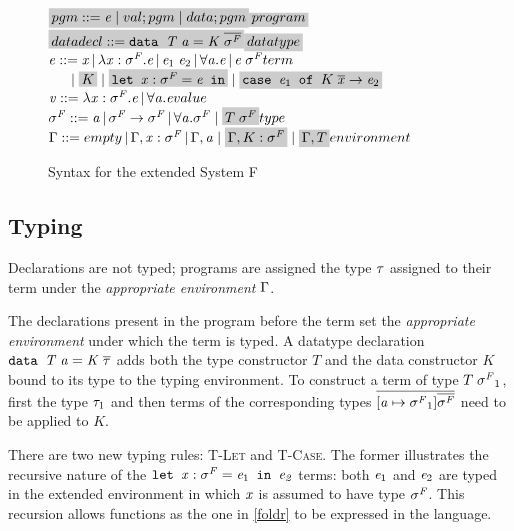 \begin{figure}
  $\highlight{pgm::= \term\; |\; val;pgm\; |\;data;pgm}\hfill \highlight{program}$\\
  $\highlight{datadecl::=\mathit{\texttt{data } T\; \tyVar = K \;\overline{\typeF}} }\hfill \highlight{datatype}$\\
  $\term ::= \tmVar\,|\,\lambda \tmVar:\typeF.\term\,|\,\term_1 \; \term_2 \,|\,\tyAbs{\tyVar}{\term}\,|\,\term\;\typeF \hfill term $\\
 $\phantom{aaa}|\;\highlight{K} \;|\;\highlight{\mathit{\texttt{let }} \tmVar : \typeF = \term \mathit{\texttt{ in}}} \;|\;\highlight{ \mathit{\texttt{case }} \term_1 \mathit{\texttt{ of }} K \; \overline{\tmVar} \rightarrow \term_2} $\\
  $\tmVal::= \lambda \tmVar:\typeF.\term \,|\,\tyAbs{\tyVar}{\term}\hfill value$\\
  $\typeF ::= \tyVar\,|\,\typeF \rightarrow \typeF \,|\,\forall \tyVar.\typeF\;|\; \highlight{T\;\typeF} \hfill type$\\
  $\tyEnv::=  empty \,|\, \tyEnv, \tmVar:\typeF\,|\, \tyEnv,\tyVar\;|\; \highlight{\tyEnv,K:\typeF}\;|\;\highlight{\tyEnv,T} \hfill environment$\\
  \caption{Syntax for the extended System F}
  \label{exsysfsyntax}
\end{figure}
\subsection{Typing}
Declarations are not typed; programs are assigned the type $\mathit{\tau}$ assigned to their term  under the \textit{appropriate environment} $\Gamma$.

The declarations present in the program before the term set the \textit{appropriate environment} under which the term is typed. A datatype declaration $\mathit{\texttt{data } T\; \mathit{a} = K \;\overline{\mathit{\tau}}}$ adds both the type constructor $T$ and the data constructor $K$ bound to its type to the typing environment. To construct a term of type $T\;\mathit{\sigma^F}_1$, first the type $\mathit{\tau}_1$ and then terms of the corresponding types $\overline{[\mathit{a}\mapsto\mathit{\sigma^F}_1]\overline{\mathit{\sigma^F}}}$ need to be applied to $K$.

There are two new typing rules: \textsc{T-Let} and \textsc{T-Case}. The former illustrates the recursive nature of the $\mathit{\texttt{let }} \mathit{x} : \mathit{\sigma^F} = \mathit{e}_1 \mathit{\texttt{ in }\mathit{e}_2}$ terms: both $\mathit{e}_1$ and $\mathit{e}_2$ are typed in the extended environment in which $\mathit{x}$ is assumed to have type $\mathit{\sigma^F}$. This recursion allows functions as the one in \ref{foldr} to be expressed in the language.

